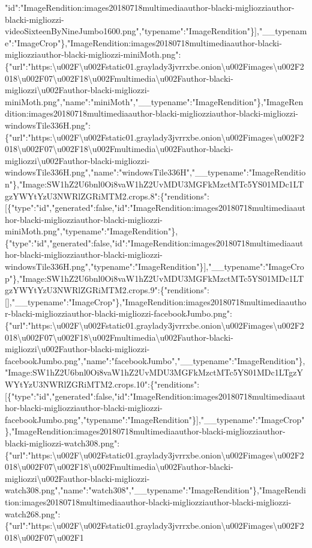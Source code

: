 "id":"ImageRendition:images20180718multimediaauthor-blacki-migliozziauthor-blacki-migliozzi-videoSixteenByNineJumbo1600.png","typename":"ImageRendition"\}{]},"\_\_typename":"ImageCrop"\},"ImageRendition:images20180718multimediaauthor-blacki-migliozziauthor-blacki-migliozzi-miniMoth.png":\{"url":"https:\textbackslash{}u002F\textbackslash{}u002Fstatic01.graylady3jvrrxbe.onion\textbackslash{}u002Fimages\textbackslash{}u002F2018\textbackslash{}u002F07\textbackslash{}u002F18\textbackslash{}u002Fmultimedia\textbackslash{}u002Fauthor-blacki-migliozzi\textbackslash{}u002Fauthor-blacki-migliozzi-miniMoth.png","name":"miniMoth","\_\_typename":"ImageRendition"\},"ImageRendition:images20180718multimediaauthor-blacki-migliozziauthor-blacki-migliozzi-windowsTile336H.png":\{"url":"https:\textbackslash{}u002F\textbackslash{}u002Fstatic01.graylady3jvrrxbe.onion\textbackslash{}u002Fimages\textbackslash{}u002F2018\textbackslash{}u002F07\textbackslash{}u002F18\textbackslash{}u002Fmultimedia\textbackslash{}u002Fauthor-blacki-migliozzi\textbackslash{}u002Fauthor-blacki-migliozzi-windowsTile336H.png","name":"windowsTile336H","\_\_typename":"ImageRendition"\},"Image:SW1hZ2U6bnl0Oi8vaW1hZ2UvMDU3MGFkMzctMTc5YS01MDc1LTgzYWYtYzU3NWRlZGRiMTM2.crops.8":\{"renditions":{[}\{"type":"id","generated":false,"id":"ImageRendition:images20180718multimediaauthor-blacki-migliozziauthor-blacki-migliozzi-miniMoth.png","typename":"ImageRendition"\},\{"type":"id","generated":false,"id":"ImageRendition:images20180718multimediaauthor-blacki-migliozziauthor-blacki-migliozzi-windowsTile336H.png","typename":"ImageRendition"\}{]},"\_\_typename":"ImageCrop"\},"Image:SW1hZ2U6bnl0Oi8vaW1hZ2UvMDU3MGFkMzctMTc5YS01MDc1LTgzYWYtYzU3NWRlZGRiMTM2.crops.9":\{"renditions":{[}{]},"\_\_typename":"ImageCrop"\},"ImageRendition:images20180718multimediaauthor-blacki-migliozziauthor-blacki-migliozzi-facebookJumbo.png":\{"url":"https:\textbackslash{}u002F\textbackslash{}u002Fstatic01.graylady3jvrrxbe.onion\textbackslash{}u002Fimages\textbackslash{}u002F2018\textbackslash{}u002F07\textbackslash{}u002F18\textbackslash{}u002Fmultimedia\textbackslash{}u002Fauthor-blacki-migliozzi\textbackslash{}u002Fauthor-blacki-migliozzi-facebookJumbo.png","name":"facebookJumbo","\_\_typename":"ImageRendition"\},"Image:SW1hZ2U6bnl0Oi8vaW1hZ2UvMDU3MGFkMzctMTc5YS01MDc1LTgzYWYtYzU3NWRlZGRiMTM2.crops.10":\{"renditions":{[}\{"type":"id","generated":false,"id":"ImageRendition:images20180718multimediaauthor-blacki-migliozziauthor-blacki-migliozzi-facebookJumbo.png","typename":"ImageRendition"\}{]},"\_\_typename":"ImageCrop"\},"ImageRendition:images20180718multimediaauthor-blacki-migliozziauthor-blacki-migliozzi-watch308.png":\{"url":"https:\textbackslash{}u002F\textbackslash{}u002Fstatic01.graylady3jvrrxbe.onion\textbackslash{}u002Fimages\textbackslash{}u002F2018\textbackslash{}u002F07\textbackslash{}u002F18\textbackslash{}u002Fmultimedia\textbackslash{}u002Fauthor-blacki-migliozzi\textbackslash{}u002Fauthor-blacki-migliozzi-watch308.png","name":"watch308","\_\_typename":"ImageRendition"\},"ImageRendition:images20180718multimediaauthor-blacki-migliozziauthor-blacki-migliozzi-watch268.png":\{"url":"https:\textbackslash{}u002F\textbackslash{}u002Fstatic01.graylady3jvrrxbe.onion\textbackslash{}u002Fimages\textbackslash{}u002F2018\textbackslash{}u002F07\textbackslash{}u002F1